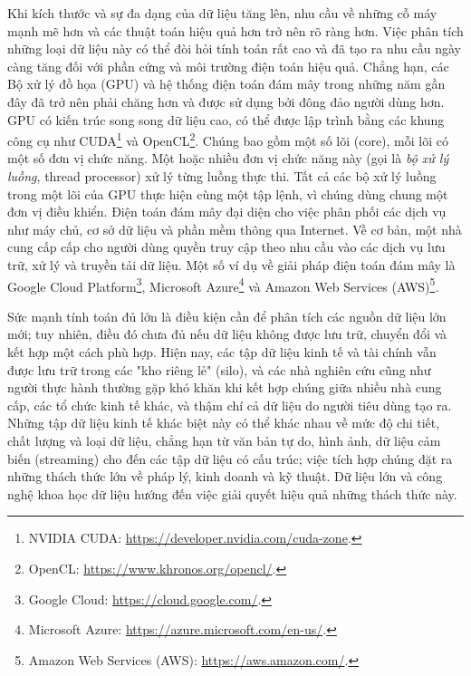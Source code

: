 Khi kích thước và sự đa dạng của dữ liệu tăng lên, nhu cầu về những cỗ máy mạnh mẽ hơn và các thuật toán hiệu quả hơn trở nên rõ ràng hơn. Việc phân tích những loại dữ liệu này có thể đòi hỏi tính toán rất cao và đã tạo ra nhu cầu ngày càng tăng đối với phần cứng và môi trường điện toán hiệu quả. Chẳng hạn, các Bộ xử lý đồ họa (GPU) và hệ thống điện toán đám mây trong những năm gần đây đã trở nên phải chăng hơn và được sử dụng bởi đông đảo người dùng hơn. GPU có kiến trúc song song dữ liệu cao, có thể được lập trình bằng các khung công cụ như CUDA\footnote{NVIDIA CUDA: \url{https://developer.nvidia.com/cuda-zone}.} và OpenCL\footnote{OpenCL: \url{https://www.khronos.org/opencl/}.}. Chúng bao gồm một số lõi (core), mỗi lõi có một số đơn vị chức năng. Một hoặc nhiều đơn vị chức năng này (gọi là \emph{bộ xử lý luồng}, thread processor) xử lý từng luồng thực thi. Tất cả các bộ xử lý luồng trong một lõi của GPU thực hiện cùng một tập lệnh, vì chúng dùng chung một đơn vị điều khiển. Điện toán đám mây đại diện cho việc phân phối các dịch vụ như máy chủ, cơ sở dữ liệu và phần mềm thông qua Internet. Về cơ bản, một nhà cung cấp cấp cho người dùng quyền truy cập theo nhu cầu vào các dịch vụ lưu trữ, xử lý và truyền tải dữ liệu. Một số ví dụ về giải pháp điện toán đám mây là Google Cloud Platform\footnote{Google Cloud: \url{https://cloud.google.com/}.}, Microsoft Azure\footnote{Microsoft Azure: \url{https://azure.microsoft.com/en-us/}.} và Amazon Web Services (AWS)\footnote{Amazon Web Services (AWS): \url{https://aws.amazon.com/}.}.

Sức mạnh tính toán đủ lớn là điều kiện cần để phân tích các nguồn dữ liệu lớn mới; tuy nhiên, điều đó chưa đủ nếu dữ liệu không được lưu trữ, chuyển đổi và kết hợp một cách phù hợp. Hiện nay, các tập dữ liệu kinh tế và tài chính vẫn được lưu trữ trong các "kho riêng lẻ" (silo), và các nhà nghiên cứu cũng như người thực hành thường gặp khó khăn khi kết hợp chúng giữa nhiều nhà cung cấp, các tổ chức kinh tế khác, và thậm chí cả dữ liệu do người tiêu dùng tạo ra. Những tập dữ liệu kinh tế khác biệt này có thể khác nhau về mức độ chi tiết, chất lượng và loại dữ liệu, chẳng hạn từ văn bản tự do, hình ảnh, dữ liệu cảm biến (streaming) cho đến các tập dữ liệu có cấu trúc; việc tích hợp chúng đặt ra những thách thức lớn về pháp lý, kinh doanh và kỹ thuật. Dữ liệu lớn và công nghệ khoa học dữ liệu hướng đến việc giải quyết hiệu quả những thách thức này.

